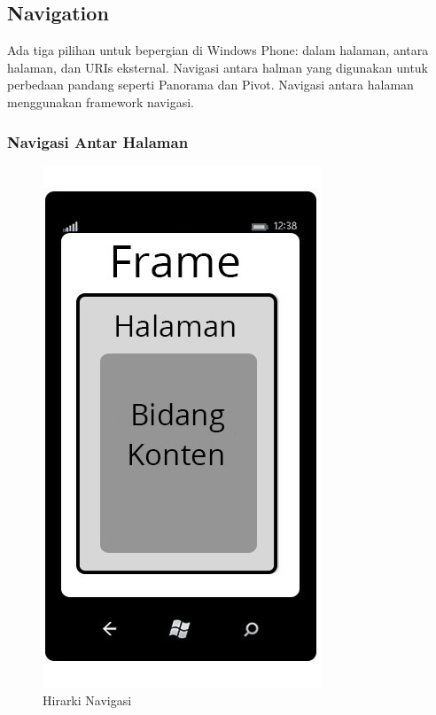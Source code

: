 \subsection{Navigation}
\label{subsec:Navigation}
\hspace{0.5cm} Ada tiga pilihan untuk bepergian di Windows Phone: dalam halaman, antara halaman, dan URIs eksternal. Navigasi antara halman yang digunakan untuk perbedaan pandang seperti Panorama dan Pivot. Navigasi antara halaman menggunakan framework navigasi. 

\subsubsection{Navigasi Antar Halaman}
\label{subsubsec:Navigasi Antar Halaman}

\begin{figure}[h]
	\centering
		\includegraphics[scale=0.5]{Gambar/nav_hierarchy.jpg}
	\caption{Hirarki Navigasi}
	\label{fig:nav_hierarchy}
\end{figure}

